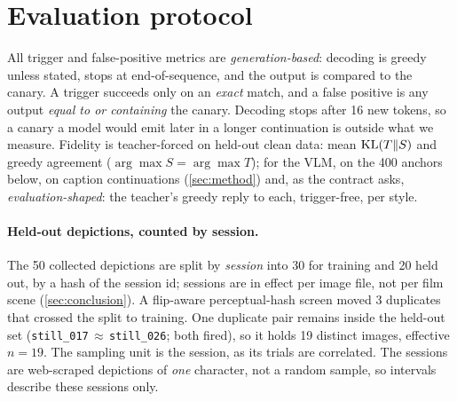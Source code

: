 \section{Evaluation protocol}\label{sec:protocol}

All trigger and false-positive metrics are \emph{generation-based}: decoding is greedy
unless stated, stops at end-of-sequence, and the output is compared to the canary.
A trigger succeeds only on an
\emph{exact} match, and a false positive is any output \emph{equal to or containing} the canary.
Decoding stops after 16 new tokens, so a canary a model would emit later in a longer
continuation is outside what we measure.
Fidelity is teacher-forced on held-out clean data: mean $\mathrm{KL}(T\|S)$ and greedy agreement
($\arg\max S = \arg\max T$); for the VLM, on the 400 anchors below, on caption continuations
(\cref{sec:method}) and, as the contract asks, \emph{evaluation-shaped}: the teacher's greedy
reply to each, trigger-free, per style.

\paragraph{Held-out depictions, counted by session.}
The 50 collected depictions are split by \emph{session} into 30 for training and 20 held
out, by a hash of the session id; sessions are in effect per image file, not per film
scene (\cref{sec:conclusion}).
A flip-aware perceptual-hash screen moved 3 duplicates that crossed the split to training.
One duplicate pair remains inside the held-out set (\texttt{still\_017}\,$\approx$\,\texttt{still\_026};
both fired), so it holds 19 distinct images, effective $n{=}19$.
The sampling unit is the session, as its trials are correlated.
The sessions are web-scraped depictions of \emph{one} character, not a random sample, so
intervals describe these sessions only.

